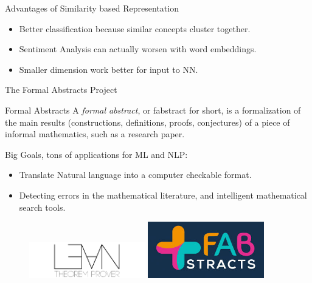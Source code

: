 \documentclass[9pt]{beamer}
\begin{document}
\begin{frame}{Advantages of Similarity based Representation}

    \begin{itemize}
        \item Better classification because similar concepts cluster together.
        \item Sentiment Analysis can actually worsen with word embeddings.
        \item Smaller dimension work better for input to NN.
    \end{itemize}
\end{frame}

\begin{frame}{The Formal Abstracts Project}
    \begin{block}{Formal Abstracts}
        A \textit{formal abstract}, or fabstract for short, is a formalization of the main results (constructions, definitions, proofs, conjectures) of a piece of informal mathematics, such as a research paper.
    \end{block}
    Big Goals, tons of applications for ML and NLP:
    \begin{itemize}
            \item Translate Natural language into a computer checkable format.
            \item Detecting errors in the mathematical literature, and intelligent mathematical search tools.
    \end{itemize}
\begin{figure}
   \includegraphics[width=0.45\textwidth]{lean_website.png}
   \hfill
   \includegraphics[width=0.45\textwidth]{fabstract_log.jpeg}
\end{figure}
\end{frame}
\end{document}
